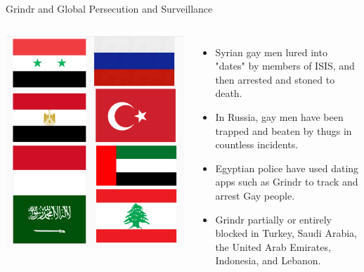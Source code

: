 \documentclass[nobackground,dvipsnames,table,aspectratio=169]{beamer}
\begin{document}
\begin{frame}{Grindr and Global Persecution and Surveillance}
    \begin{columns}
            \includegraphics[width=\textwidth]{flags}
            \begin{itemize}
                \item Syrian gay men lured into "dates" by members of ISIS, and then arrested and stoned to death. 
                \item In Russia, gay men have been trapped and beaten by thugs in countless incidents.
                \item Egyptian police have used dating apps such as Grindr to track and arrest Gay people.
                \item Grindr partially or entirely blocked in Turkey, Saudi Arabia, the United Arab Emirates, Indonesia, and Lebanon.
            \end{itemize}
    \end{columns}
\end{frame}
\end{document}
